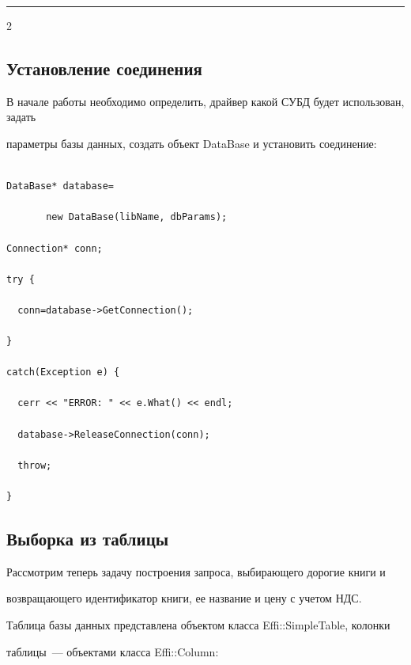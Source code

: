 \vspace*{3pt}



\hrule



\begin{multicols}{2}





\subsection{Установление соединения} %



В начале работы необходимо определить, драйвер какой СУБД будет использован, задать 

параметры базы данных, создать объект DataBase и установить соединение: 

\begin{verbatim}

DataBase* database= 

       new DataBase(libName, dbParams);

Connection* conn;

try {

  conn=database->GetConnection();

}

catch(Exception e) {

  cerr << "ERROR: " << e.What() << endl;

  database->ReleaseConnection(conn);

  throw;

}

\end{verbatim}





\subsection{Выборка из таблицы} %



Рассмотрим теперь задачу построения запроса, выбирающего дорогие книги и 

возвращающего идентификатор книги, ее название и цену с учетом НДС.



Таблица базы данных представлена объектом класса {\sf Effi::SimpleTable}, колонки 

таблицы~--- объектами класса {\sf Effi::Column}:


\end{multicols}
